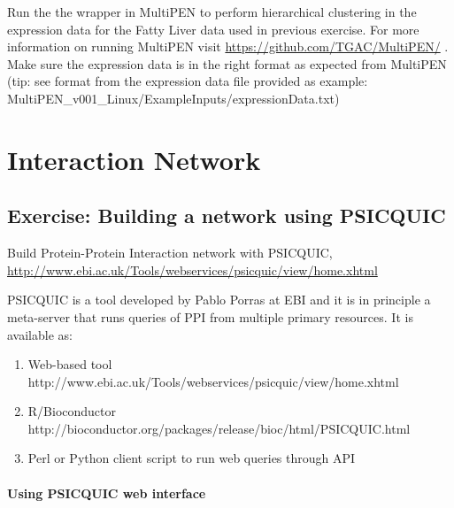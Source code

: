 \documentclass[11pt, oneside]{article}   	%
\begin{document}
Run the the wrapper in MultiPEN to perform hierarchical clustering in the expression data for the Fatty Liver data \cite{Wruck2015} used in previous exercise. For more information on running MultiPEN visit \url{https://github.com/TGAC/MultiPEN/} \cite{Rey2017}. Make sure the expression data is in the right format as expected from MultiPEN (tip: see format from the expression data file provided as example: MultiPEN\_v001\_Linux/ExampleInputs/expressionData.txt)




\section{Interaction Network}

\subsection{Exercise: Building a network using PSICQUIC}

Build Protein-Protein Interaction network with PSICQUIC, \url{http://www.ebi.ac.uk/Tools/webservices/psicquic/view/home.xhtml}

PSICQUIC is a tool developed by Pablo Porras at EBI and it is in principle a meta-server that runs queries of PPI from multiple primary resources. It is available as:

\begin{enumerate}
   
   \item Web-based tool http://www.ebi.ac.uk/Tools/webservices/psicquic/view/home.xhtml
   
   \item R/Bioconductor http://bioconductor.org/packages/release/bioc/html/PSICQUIC.html
   
   \item Perl or Python client script to run web queries through API

\end{enumerate}


\paragraph{Using PSICQUIC web interface}
\paragraph{}
\end{document}
